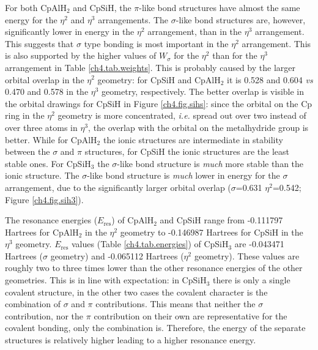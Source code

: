 For both CpAlH$_2$ and CpSiH, the $\pi$-like bond structures have almost the same energy for the $\eta^{2}$ and $\eta^{3}$ arrangements. The $\sigma$-like bond structures are, however, significantly lower in energy in the $\eta^{2}$ arrangement, than in the $\eta^{3}$ arrangement. This suggests that $\sigma$ type bonding is most important in the $\eta^2$ arrangement. This is also supported by the higher values of $W_\sigma$ for the $\eta^2$ than for the $\eta^3$ arrangement in Table \ref{ch4.tab.weights}. This is probably caused by the larger orbital overlap in the $\eta^2$ geometry: for CpSiH and CpAlH$_2$ it is 0.528 and 0.604 \textit{vs} 0.470 and 0.578 in the $\eta^3$ geometry, respectively. The better overlap is visible in the orbital drawings for CpSiH in Figure \ref{ch4.fig.sihs}: since the orbital on the Cp ring in the $\eta^2$ geometry is more concentrated, \textit{i.e.} spread out over two instead of over three atoms in $\eta^3$, the overlap with the orbital on the metalhydride group is better. While for CpAlH$_2$ the ionic structures are intermediate in stability between the $\sigma$ and $\pi$ structures, for CpSiH the ionic structures are the least stable ones. For CpSiH$_3$ the $\sigma$-like bond structure is \textit{much} more stable than the ionic structure. The $\sigma$-like bond structure is \textit{much} lower in energy for the $\sigma$ arrangement, due to the significantly larger orbital overlap ($\sigma$=0.631 $\eta^2$=0.542; Figure \ref{ch4.fig.sih3}). 

The resonance energies ($E_\mathrm{res}$) of CpAlH$_2$ and CpSiH range from -0.111797 Hartrees for CpAlH$_2$ in the $\eta^2$ geometry to -0.146987 Hartrees for CpSiH in the $\eta^3$ geometry. $E_\mathrm{res}$ values (Table \ref{ch4.tab.energies}) of CpSiH$_3$ are -0.043471 Hartrees ($\sigma$ geometry) and -0.065112 Hartrees ($\eta^2$ geometry). These values are roughly two to three times lower than the other resonance energies of the other geometries. This is in line with expectation: in CpSiH$_3$ there is only a single covalent structure, in the other two cases the covalent character is the combination of $\sigma$ and $\pi$ contributions. This means that neither the $\sigma$ contribution, nor the $\pi$ contribution on their own are representative for the covalent bonding, only the combination is. Therefore, the energy of the separate structures is relatively higher leading to a higher resonance energy.

